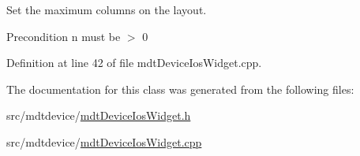 Set the maximum columns on the layout. 

\begin{DoxyPrecond}{Precondition}
n must be $>$ 0 
\end{DoxyPrecond}


Definition at line 42 of file mdt\-Device\-Ios\-Widget.\-cpp.



The documentation for this class was generated from the following files\-:\begin{DoxyCompactItemize}
\item 
src/mdtdevice/\hyperlink{mdt_device_ios_widget_8h}{mdt\-Device\-Ios\-Widget.\-h}\item 
src/mdtdevice/\hyperlink{mdt_device_ios_widget_8cpp}{mdt\-Device\-Ios\-Widget.\-cpp}\end{DoxyCompactItemize}
